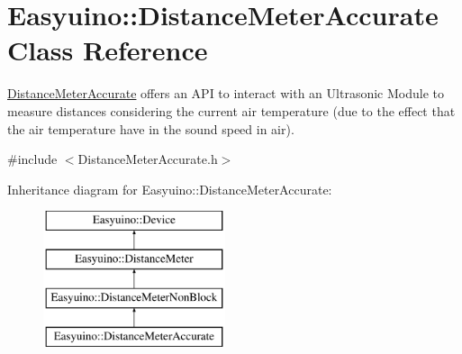 \hypertarget{class_easyuino_1_1_distance_meter_accurate}{}\section{Easyuino\+:\+:Distance\+Meter\+Accurate Class Reference}
\label{class_easyuino_1_1_distance_meter_accurate}


\hyperlink{class_easyuino_1_1_distance_meter_accurate}{Distance\+Meter\+Accurate} offers an A\+PI to interact with an Ultrasonic Module to measure distances considering the current air temperature (due to the effect that the air temperature have in the sound speed in air).  




{\ttfamily \#include $<$Distance\+Meter\+Accurate.\+h$>$}

Inheritance diagram for Easyuino\+:\+:Distance\+Meter\+Accurate\+:\begin{figure}[H]
\begin{center}
\leavevmode
\includegraphics[height=4.000000cm]{class_easyuino_1_1_distance_meter_accurate}
\end{center}
\end{figure}
